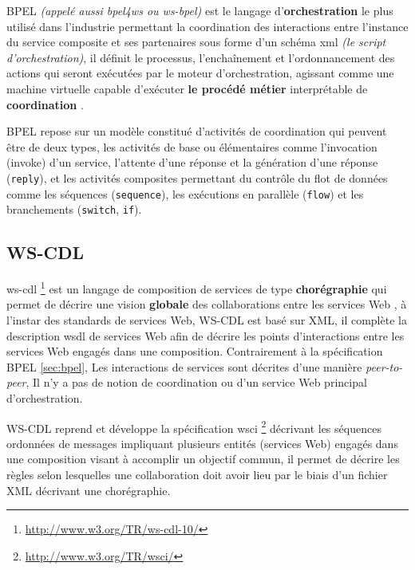   \textsc{BPEL} \textit{(appelé aussi \acrshort{bpel4ws} ou
    \acrshort{ws-bpel})} est le langage d'\textbf{orchestration} le
  plus utilisé dans l'industrie permettant la coordination des
  interactions entre l'instance du service composite et ses
  partenaires sous forme d'un schéma \acrshort{xml} \textit{(le script
    d'orchestration)}, il définit le processus, l'enchaînement et
  l'ordonnancement des actions qui seront exécutées par le moteur
  d'orchestration, agissant comme une machine virtuelle capable
  d'exécuter \textbf{le procédé métier} interprétable de
  \textbf{coordination} \cite{chollet2009orchestration}.\medskip

  \textsc{BPEL} repose sur un modèle constitué d'activités de
  coordination qui peuvent être de deux types, les activités de base
  ou élémentaires comme l'invocation (invoke) d'un service, l'attente
  d'une réponse et la génération d'une réponse (\verb|reply|), et les
  activités composites permettant du contrôle du flot de données comme
  les séquences (\verb|sequence|), les exécutions en parallèle
  (\verb|flow|) et les branchements (\verb|switch|, \verb|if|).

  \subsection{WS-CDL}
  \label{sec:WS-CDL}
  \acrshort{ws-cdl} \footnote{\url{http://www.w3.org/TR/ws-cdl-10/}}
  \cite{kavantzas2005web} est un langage de composition de services de
  type \textbf{chorégraphie} qui permet de décrire une vision
  \textbf{globale} des collaborations entre les services Web
  \cite{elie2010}, à l'instar des standards de services Web,
  \textsc{WS-CDL} est basé sur \textsc{XML}, il complète la
  description \acrshort{wsdl} de services Web afin de décrire les
  points d'interactions entre les services Web engagés dans une
  composition. Contrairement à la spécification \textsc{BPEL}
  \ref{sec:bpel}, Les interactions de services sont décrites d'une
  manière \textit{peer-to-peer}, Il n'y a pas de notion de
  coordination ou d'un service Web principal d'orchestration.\medskip

  \textsc{WS-CDL} reprend et développe la spécification
  \acrshort{wsci} \footnote{\url{http://www.w3.org/TR/wsci/}}
  \cite{arkin2002web} décrivant les séquences ordonnées de messages
  impliquant plusieurs entités (services Web) engagés dans une
  composition visant à accomplir un objectif commun, il permet de
  décrire les règles selon lesquelles une collaboration doit avoir
  lieu par le biais d'un fichier \textsc{XML} décrivant une
  chorégraphie.

